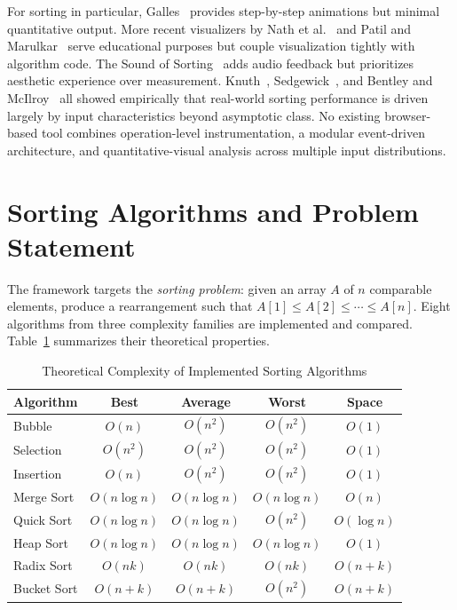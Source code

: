 \documentclass[conference]{IEEEtran}
\begin{document}
For sorting in particular, Galles~\cite{galles2011} provides step-by-step
animations but minimal quantitative output. More recent visualizers by Nath et
al.~\cite{nath2021} and Patil and Marulkar~\cite{patil2021} serve educational
purposes but couple visualization tightly with algorithm code. The Sound of
Sorting~\cite{bingmann2013} adds audio feedback but prioritizes aesthetic
experience over measurement. Knuth~\cite{knuth1998}, Sedgewick~\cite{sedgewick1975},
and Bentley and McIlroy~\cite{bentley1993} all showed empirically that
real-world sorting performance is driven largely by input characteristics beyond
asymptotic class. No existing browser-based tool combines operation-level
instrumentation, a modular event-driven architecture, and quantitative-visual
analysis across multiple input distributions.

\section{Sorting Algorithms and Problem Statement}

The framework targets the \emph{sorting problem}: given an array $A$ of $n$
comparable elements, produce a rearrangement such that $A[1] \leq A[2] \leq
\cdots \leq A[n]$. Eight algorithms from three complexity families are
implemented and compared. Table~\ref{tab:complexity} summarizes their
theoretical properties.

\begin{table}[!t]
\caption{Theoretical Complexity of Implemented Sorting Algorithms}
\label{tab:complexity}
\centering
\setlength{\tabcolsep}{4pt}
\begin{tabular}{lcccc}
\toprule
Algorithm    & Best         & Average      & Worst        & Space      \\
\midrule
Bubble       & $O(n)$       & $O(n^2)$     & $O(n^2)$     & $O(1)$     \\
Selection    & $O(n^2)$     & $O(n^2)$     & $O(n^2)$     & $O(1)$     \\
Insertion    & $O(n)$       & $O(n^2)$     & $O(n^2)$     & $O(1)$     \\
Merge Sort   & $O(n\log n)$ & $O(n\log n)$ & $O(n\log n)$ & $O(n)$     \\
Quick Sort   & $O(n\log n)$ & $O(n\log n)$ & $O(n^2)$     & $O(\log n)$\\
Heap Sort    & $O(n\log n)$ & $O(n\log n)$ & $O(n\log n)$ & $O(1)$     \\
Radix Sort   & $O(nk)$      & $O(nk)$      & $O(nk)$      & $O(n+k)$   \\
Bucket Sort  & $O(n+k)$     & $O(n+k)$     & $O(n^2)$     & $O(n+k)$   \\
\bottomrule
\end{tabular}
\end{table}
\end{document}
